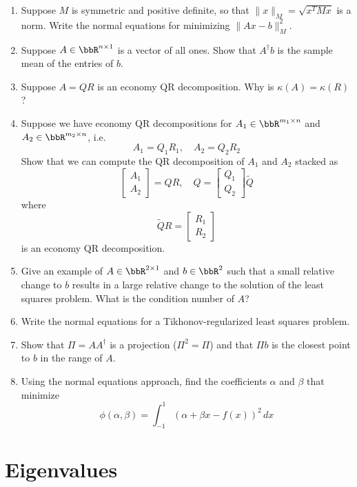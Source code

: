 \documentclass[12pt, leqno]{article}
\begin{document}
\begin{enumerate}
\item
  Suppose $M$ is symmetric and positive definite, so that
  $\|x\|_M = \sqrt{x^T M x}$ is a norm.  Write the normal
  equations for minimizing $\|Ax-b\|_M^2$.
\item
  Suppose $A \in \bbR^{n \times 1}$ is a vector of all ones.
  Show that $A^{\dagger} b$ is the sample mean of the entries
  of $b$.
\item
  Suppose $A = QR$ is an economy QR decomposition.
  Why is $\kappa(A) = \kappa(R)$?
\item
  Suppose we have economy QR decompositions for
  $A_1 \in \bbR^{m_1 \times n}$ and $A_2 \in \bbR^{m_2 \times n}$,
  i.e.
  \[
    A_1 = Q_1 R_1, \quad A_2 = Q_2 R_2
  \]
  Show that we can compute the QR decomposition of
  $A_1$ and $A_2$ stacked as
  \[
    \begin{bmatrix} A_1 \\ A_2 \end{bmatrix} = Q R, \quad
    Q = \begin{bmatrix} Q_1 \\ Q_2 \end{bmatrix} \tilde{Q}
  \]
  where
  \[
    \tilde{Q} R = \begin{bmatrix} R_1 \\ R_2 \end{bmatrix}
  \]
  is an economy QR decomposition.
\item
  Give an example of $A \in \bbR^{2 \times 1}$ and $b \in \bbR^2$
  such that a small relative change to $b$ results in a large
  relative change to the solution of the least squares problem.
  What is the condition number of $A$?
\item
  Write the normal equations for a Tikhonov-regularized least squares
  problem.
\item
  Show that $\Pi = A A^\dagger$ is a projection ($\Pi^2 = \Pi$) and
  that $\Pi b$ is the closest point to $b$ in the range of $A$.
\item
  Using the normal equations approach, find the coefficients
  $\alpha$ and $\beta$ that minimize
  \[
    \phi(\alpha, \beta) = \int_{-1}^1 (\alpha + \beta x - f(x))^2 \, dx
  \]
\end{enumerate}

\newpage
\section{Eigenvalues}
\end{document}
